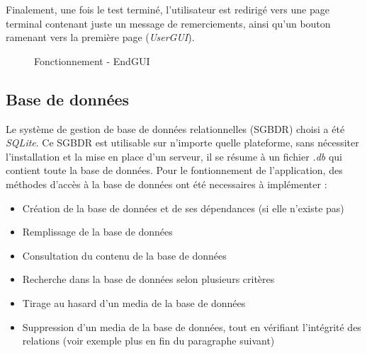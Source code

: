 Finalement, une fois le test terminé, l'utilisateur est redirigé vers une page terminal contenant juste un message de remerciements, ainsi qu'un bouton ramenant vers la première page (\textit{UserGUI}).

\begin{figure}[!ht]
\begin{center}
  \caption{Fonctionnement - EndGUI}
  \label{endGUI} 
\end{center}
\end{figure}

\subsection{Base de données}\label{BDD}

Le système de gestion de base de données relationnelles (SGBDR) choisi a été \textit{SQLite}. Ce SGBDR est utilisable sur n'importe quelle plateforme, sans nécessiter l'installation et la mise en place d'un serveur, il se résume à un fichier \textit{.db} qui contient toute la base de données.
Pour le fontionnement de l'application, des méthodes d'accès à la base de données ont été necessaires à implémenter :


\begin{itemize}
 \item Création de la base de données et de ses dépendances (si elle n'existe pas)
 \item Remplissage de la base de données
 \item Consultation du contenu de la base de données
 \item Recherche dans la base de données selon plusieurs critères
 \item Tirage au hasard d'un media de la base de données
 \item Suppression d'un media de la base de données, tout en vérifiant l'intégrité des relations (voir exemple plus en fin du paragraphe suivant)
\end{itemize}


